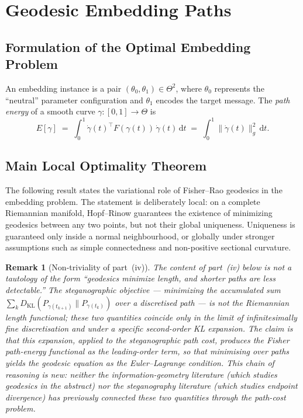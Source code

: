 \documentclass[a4paper,fleqn]{cas-dc}
\newtheorem{remark}{Remark}
\begin{document}
\section{Geodesic Embedding Paths}
\label{sec:geodesics}

\subsection{Formulation of the Optimal Embedding Problem}

An embedding instance is a pair $(\theta_0, \theta_1)\in\Theta^2$, where
$\theta_0$ represents the ``neutral'' parameter configuration and $\theta_1$
encodes the target message.
The \emph{path energy} of a smooth curve $\gamma:[0,1]\to\Theta$ is
\begin{equation}
  E[\gamma] \;=\; \int_0^1 \dot\gamma(t)^\top F(\gamma(t))\,\dot\gamma(t)\,\mathrm{d}t
  \;=\; \int_0^1 \|\dot\gamma(t)\|_g^2\,\mathrm{d}t.
  \label{eq:path_energy}
\end{equation}

\subsection{Main Local Optimality Theorem}
\label{sec:geodesic_optimality}

The following result states the variational role of Fisher--Rao geodesics in
the embedding problem.  The statement is deliberately local: on a complete
Riemannian manifold, Hopf--Rinow guarantees the existence of minimizing
geodesics between any two points, but not their global uniqueness.  Uniqueness
is guaranteed only inside a normal neighbourhood, or globally under stronger
assumptions such as simple connectedness and non-positive sectional curvature.

\begin{remark}[Non-triviality of part~(iv)]
The content of part~(iv) below is \emph{not} a tautology of the form
``geodesics minimize length, and shorter paths are less detectable.''
The steganographic objective --- minimizing the accumulated sum
$\sum_k D_{\mathrm{KL}}(P_{\gamma(t_{k+1})}\|P_{\gamma(t_k)})$ over a
discretised path --- is not the Riemannian length functional; these two
quantities coincide only in the limit of infinitesimally fine discretisation
and under a specific second-order KL expansion.
The claim is that this expansion, applied to the steganographic path cost,
produces the Fisher path-energy functional as the leading-order term, so that
minimising over paths yields the geodesic equation as the Euler--Lagrange
condition.
This chain of reasoning is new: neither the information-geometry literature
(which studies geodesics in the abstract) nor the steganography literature
(which studies endpoint divergence) has previously connected these two
quantities through the path-cost problem.
\end{remark}
\end{document}
